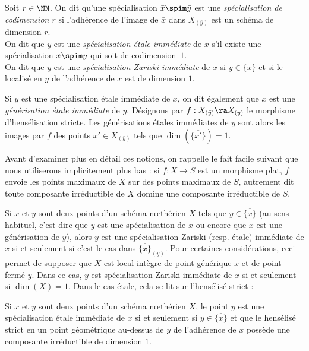 \documentclass[10pt]{../fichiers-configuration-latex/smfart}
\begin{document}
\begin{definition2} \label{14-definition-specialisation-immediate} Soit $r \in \NN$. On dit qu'une
spécialisation $\bar{x} \spim \bar{y}$ est une  \emph{spécialisation de codimension $r$} si
l'adhérence de l'image de $\bar{x}$ dans $X_{(\bar{y})}$ est un schéma de dimension $r$.  \\ On dit
que $y$ est une \emph{spécialisation étale immédiate} de $x$ s'il existe une spécialisation $\bar{x}
\spim \bar{y}$ qui soit de codimension~$1$.  \\ On dit que $y$ est une \emph{spécialisation Zariski
immédiate} de $x$  si $y \in \overline{\{ x \} }$ et si le localisé en $y$ de l'adhérence de $x$
est de dimension $1$.  \end{definition2}

Si $y$ est une {spécialisation étale immédiate} de $x$, on dit également que $x$ est une
\emph{générisation étale immédiate} de $y$. Désignons par $f:X_{(\bar y)}\ra X_{(y)}$ le morphisme
d'hensélisation stricte. Les générisations  étales immédiates de $y$ sont alors les images par $f$
des points $x'\in X_{(\bar y)}$ tels que $\dim(\overline{\{x'\}})=1$.

Avant d'examiner plus en détail ces notions, on rappelle le fait facile suivant que nous utiliserons
implicitement plus bas : si $f\colon X\to S$ est un morphisme plat, $f$ envoie les points maximaux
de $X$ sur des points maximaux de $S$, autrement dit toute composante irréductible de $X$ domine une
composante irréductible de $S$.

Si $x$ et $y$ sont deux points d'un schéma nœthérien $X$ tels que $y\in \overline{\{x\}}$ (au sens
habituel, c'est dire que $y$ est une spécialisation de $x$ ou encore que $x$ est une générisation de
$y$), alors $y$ est une spécialisation Zariski (resp. étale) immédiate de $x$ si et seulement si
c'est le cas dans $\overline{\{x\}}_{(y)}$. Pour certaines considérations, ceci permet de supposer
que $X$ est local intègre de point générique $x$ et de point fermé $y$. Dans ce cas, $y$ est
spécialisation Zariski immédiate de $x$ si et seulement si $\dim(X)=1$. Dans le cas étale, cela se
lit sur l'hensélisé strict :

\begin{proposition2} \label{14-proposition-Laszlo-1} Si $x$ et $y$ sont deux points d'un schéma
nœthérien $X$, le point $y$ est une {spécialisation étale immédiate} de $x$ si et seulement si $y
\in \overline{\{ x \} }$ et que le hensélisé strict en un point géométrique au-dessus de $y$ de
l'adhérence de $x$ possède une composante irréductible de dimension $1$.  \end{proposition2}
\end{document}
